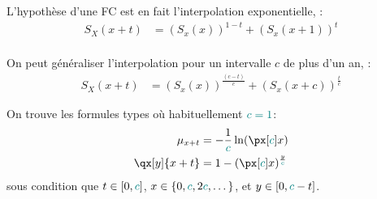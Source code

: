 \documentclass[10pt, french]{article}
\begin{document}
\begin{multicols*}{3}
\begin{definitionNOHFILL}
\tcbline

L'hypothèse d'une FC est en fait l'interpolation exponentielle, :
\begin{align*}
	S_{X}(x + t) 
	&=	\left(S_{x}(x)\right)^{1 - t} + \left(S_{x}(x + 1)\right)^{t}	\\
\end{align*}

On peut généraliser l'interpolation pour un intervalle $c$ de plus d'un an,  :
\begin{align*}
	S_{X}(x + t) 
	&=	\left(S_{x}(x)\right)^{\frac{(c - t)}{c}} + \left(S_{x}(x + c)\right)^{\frac{t}{c}}	
\end{align*}
\end{definitionNOHFILL}

On trouve les formules types où habituellement $\textcolor{teal}{c = 1}$:
\begin{align*}
	\mu_{x + t} 
	&=	-\frac{1}{\textcolor{teal}{c}} \ln(\px[\textcolor{teal}{c}]{x})	\\
	\qx[y]{x + t} 
	&=	1 - (\px[\textcolor{teal}{c}]{x})^{\frac{y}{\textcolor{teal}{c}}}	\\
\end{align*}
sous condition que $t \in[0, \textcolor{teal}{c}]$, $x \in \{0, \textcolor{teal}{c}, 2\textcolor{teal}{c}, \dots\}$, et $y \in [0, \textcolor{teal}{c} - t]$.



\end{multicols*}
\end{document}
